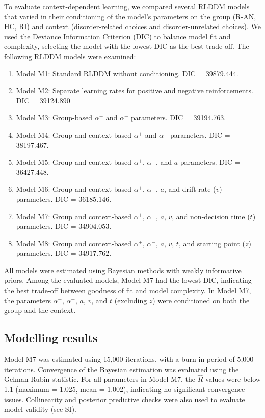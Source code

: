 \documentclass[
  man,floatsintext]{apa6}
\providecommand{\tightlist}{%
  \setlength{\itemsep}{0pt}\setlength{\parskip}{0pt}}
\begin{document}
To evaluate context-dependent learning, we compared several RLDDM models that varied in their conditioning of the model's parameters on the group (R-AN, HC, RI) and context (disorder-related choices and disorder-unrelated choices). We used the Deviance Information Criterion (DIC) to balance model fit and complexity, selecting the model with the lowest DIC as the best trade-off. The following RLDDM models were examined:

\begin{enumerate}
\def\labelenumi{\arabic{enumi}.}
\tightlist
\item
  Model M1: Standard RLDDM without conditioning. DIC = 39879.444.
\item
  Model M2: Separate learning rates for positive and negative reinforcements. DIC = 39124.890
\item
  Model M3: Group-based \(\alpha^+\) and \(\alpha^-\) parameters. DIC = 39194.763.
\item
  Model M4: Group and context-based \(\alpha^+\) and \(\alpha^-\) parameters. DIC = 38197.467.
\item
  Model M5: Group and context-based \(\alpha^+\), \(\alpha^-\), and \(a\) parameters. DIC = 36427.448.
\item
  Model M6: Group and context-based \(\alpha^+\), \(\alpha^-\), \(a\), and drift rate (\(v\)) parameters. DIC = 36185.146.
\item
  Model M7: Group and context-based \(\alpha^+\), \(\alpha^-\), \(a\), \(v\), and non-decision time (\(t\)) parameters. DIC = 34904.053.
\item
  Model M8: Group and context-based \(\alpha^+\), \(\alpha^-\), \(a\), \(v\), \(t\), and starting point (\(z\)) parameters. DIC = 34917.762.
\end{enumerate}

All models were estimated using Bayesian methods with weakly informative priors. Among the evaluated models, Model M7 had the lowest DIC, indicating the best trade-off between goodness of fit and model complexity. In Model M7, the parameters \(\alpha^+\), \(\alpha^-\), \(a\), \(v\), and \(t\) (excluding \(z\)) were conditioned on both the group and the context.

\hypertarget{modelling-results}{%
\subsection{Modelling results}\label{modelling-results}}

Model M7 was estimated using 15,000 iterations, with a burn-in period of 5,000 iterations. Convergence of the Bayesian estimation was evaluated using the Gelman-Rubin statistic. For all parameters in Model M7, the \(\hat{R}\) values were below 1.1 (maximum = 1.025, mean = 1.002), indicating no significant convergence issues. Collinearity and posterior predictive checks were also used to evaluate model validity (see SI).
\end{document}
